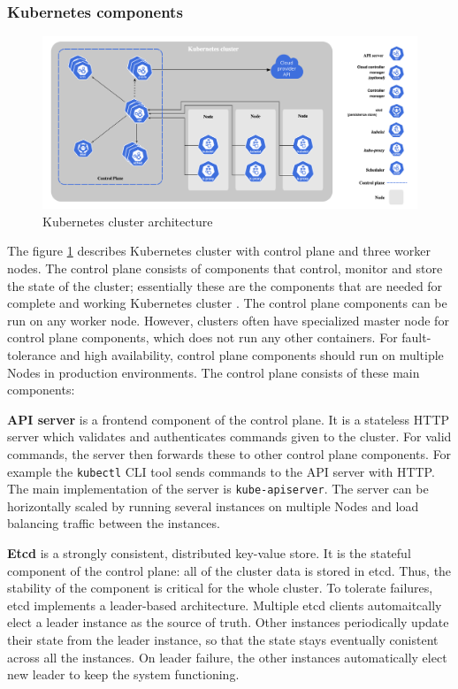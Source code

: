 \documentclass[english,12pt,a4paper,pdftex,sci,utf8]{aaltothesis}
\begin{document}
\subsubsection{Kubernetes components} \label{control-plane}

\begin{figure}[h!]
  \centering
  \includegraphics[width=\linewidth]{files/k8s-arch.png}
  \caption{Kubernetes cluster architecture \cite{k8s-docs-control-plane}}
  \label{figure-2}
\end{figure}

The figure \ref{figure-2} describes Kubernetes cluster with control plane and three worker nodes. The control plane consists of components that control, monitor and store the state of the cluster; essentially these are the components that are needed for complete and working Kubernetes cluster \cite{k8s-docs-control-plane}. The control plane components can be run on any worker node. However, clusters often have specialized master node for control plane components, which does not run any other containers. For fault-tolerance and high availability, control plane components should run on multiple Nodes in production environments. The control plane consists of these main components:

\textbf{API server} is a frontend component of the control plane. It is a stateless HTTP server which validates and authenticates commands given to the cluster. For valid commands, the server then forwards these to other control plane components. For example the \texttt{kubectl} CLI tool sends commands to the API server with HTTP. The main implementation of the server is \texttt{kube-apiserver}. The server can be horizontally scaled by running several instances on multiple Nodes and load balancing traffic between the instances.

\textbf{Etcd} \cite{etcd} is a strongly consistent, distributed key-value store. It is the stateful component of the control plane: all of the cluster data is stored in etcd. Thus, the stability of the component is critical for the whole cluster. To tolerate failures, etcd implements a leader-based architecture. Multiple etcd clients automaitcally elect a leader instance as the source of truth. Other instances periodically update their state from the leader instance, so that the state stays eventually conistent across all the instances. On leader failure, the other instances automatically elect new leader to keep the system functioning.
\end{document}
